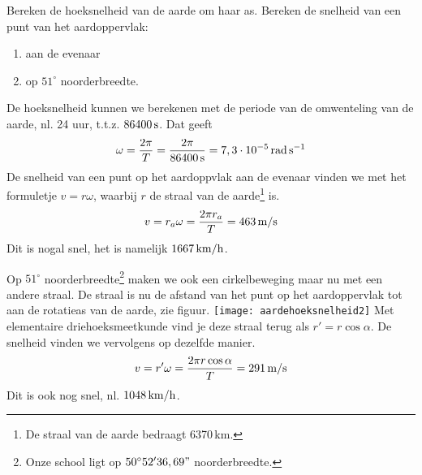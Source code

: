 \begin{exercise}[Opgave] Bereken de hoeksnelheid van de aarde om haar as. Bereken de
snelheid van een punt van het aardoppervlak:
\begin{enumerate}
\item aan de evenaar
\item op $51^\circ$ noorderbreedte.
\end{enumerate}
\begin{oplossing}
De hoeksnelheid kunnen we berekenen met de periode van de omwenteling van de aarde, nl. 24 uur, t.t.z. $86400\rm\,s$. Dat geeft
\begin{eqnarray*}
\omega=\frac{2\pi}{T}=\frac{2\pi}{86400\rm\,s}=7,3\cdot10^{-5}\rm\,rad\,s^{-1}
\end{eqnarray*}
De snelheid van een punt op het aardoppvlak aan de evenaar vinden we met het formuletje $v=r\omega$, waarbij $r$ de straal van de aarde\footnote{De straal van de aarde bedraagt 6370\rm\,km.} is.
\begin{eqnarray*}
v=r_a\omega=\frac{2\pi r_a}{T}=463\rm\,m/s
\end{eqnarray*}
Dit is nogal snel, het is namelijk $1667\rm\,km/h$. 

Op $51^\circ$ noorderbreedte\footnote{Onze school ligt op $50^\circ 52'36,69"$ noorderbreedte.} maken we ook een cirkelbeweging maar nu met een andere straal. De straal is nu de afstand van het punt op het aardoppervlak tot aan de rotatieas van de aarde, zie figuur. 
\centering
\texttt{[image: aardehoeksnelheid2]}
Met elementaire driehoeksmeetkunde vind je deze straal terug als $r'=r\cos\alpha$. De snelheid vinden we vervolgens op dezelfde manier.
\begin{eqnarray*}
v=r'\omega=\frac{2\pi r\cos\alpha}{T}=291\rm\,m/s
\end{eqnarray*}
Dit is ook nog snel, nl. $1048\rm\,km/h$.
\end{oplossing}



\end{exercise}

